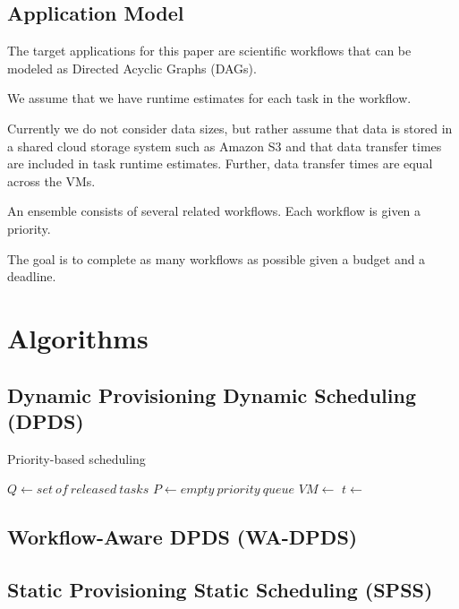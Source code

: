 \documentclass{sig-alternate}
\begin{document}
\subsection{Application Model}
The target applications for this paper are scientific workflows that can be modeled as Directed Acyclic Graphs (DAGs).

We assume that we have runtime estimates for each task in the workflow.

Currently we do not consider data sizes, but rather assume that data is stored in a shared cloud storage system such as Amazon S3 and that data transfer times are included in task runtime estimates. Further, data transfer times are equal across the VMs.

An ensemble consists of several related workflows. Each workflow is given a priority.

The goal is to complete as many workflows as possible given a budget and a deadline.

\section{Algorithms}
\subsection{Dynamic Provisioning Dynamic Scheduling (DPDS)}

\begin{algorithm}
\caption{Priority-based scheduling}
\label{alg:ds}
\begin{algorithmic}[1]
    \State $Q\gets set\ of\ released\ tasks$
    \State $P\gets empty\ priority\ queue$
    		\State {} 
    	\EndFor
    		\State $VM\gets$ 
    		\State $t\gets$ 
    		\State {}
    	\EndWhile
    	\State {}
    	\State {}
    \EndWhile
\EndProcedure
\end{algorithmic} 
\end{algorithm}

\subsection{Workflow-Aware DPDS (WA-DPDS)}

\subsection{Static Provisioning Static Scheduling (SPSS)}
\end{document}
